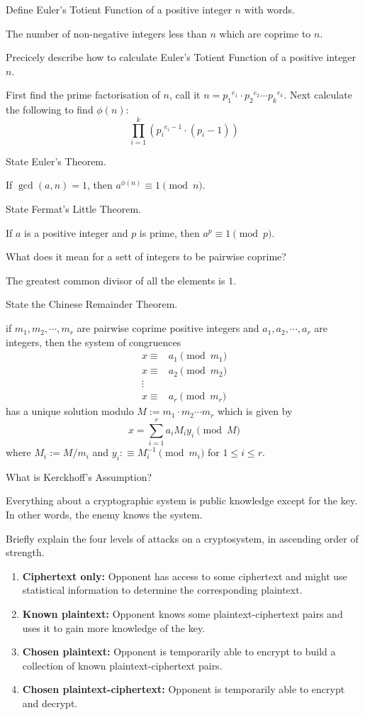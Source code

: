 \documentclass{article}
\newcounter{qcounter}
\newcommand{\showqcounter}{\theqcounter}
\newcommand{\question}{\vspace{5mm}\addtocounter{qcounter}{1}\vspace{5mm}{\bf Q\showqcounter: }}
\newcommand{\answer}{\vspace{5mm}{\bf A\showqcounter: }}
\begin{document}
\question Define Euler's Totient Function of a positive integer $n$ with words.

\answer The number of non-negative integers less than $n$ which are coprime to $n$.


\question Precicely describe how to calculate Euler's Totient Function of a positive integer $n$.

\answer First find the prime factorisation of $n$, call it 
$n = {p_1}^{e_1} \cdot {p_2}^{e_2} \cdots {p_k}^{e_k}$. Next calculate the following to find $\phi(n)$:
$$
    \prod_{i = 1}^k \left( {p_i}^{e_i - 1} \cdot (p_i - 1) \right)
$$

\question State Euler's Theorem.

\answer If $\gcd(a, n) = 1$, then $a^{\phi(n)} \equiv 1 \pmod n$.


\question State Fermat's Little Theorem.

\answer If $a$ is a positive integer and $p$ is prime, then $a^p \equiv 1 \pmod{p}$.


\question What does it mean for a sett of integers to be pairwise coprime?

\answer The greatest common divisor of all the elements is $1$.


\question State the Chinese Remainder Theorem.

\answer if $m_1, m_2, \cdots, m_r$ are pairwise coprime positive integers and $a_1, a_2, \cdots, a_r$ are integers, 
then the system of congruences 
\begin{align*}
x \equiv& a_1 \pmod{m_1} \\
x \equiv& a_2 \pmod{m_2} \\
  \vdots&\\
x \equiv& a_r \pmod{m_r}
\end{align*}
has a unique solution modulo $M := m_1 \cdot m_2 \cdots m_r$ which is given by
$$
    x = \sum_{i=1}^r a_i M_i y_i \pmod{M}
$$
where $M_i := M / m_i$ and $y_i :\equiv M_i^{-1} \pmod{m_i}$ for $1 \leq i \leq r$. 


\question What is Kerckhoff's Assumption?

\answer Everything about a cryptographic system is public knowledge except for the key. In other words, the enemy knows the system.


\question Briefly explain the four levels of attacks on a cryptosystem, in ascending order of strength.

\answer \begin{enumerate}
  \item {\bf Ciphertext only:} Opponent has access to some ciphertext and might use statistical information to determine the corresponding plaintext.
  \item {\bf Known plaintext:} Opponent knows some plaintext-ciphertext pairs and uses it to gain more knowledge of the key.
  \item {\bf Chosen plaintext:} Opponent is temporarily able to encrypt to build a collection of known plaintext-ciphertext pairs. 
  \item {\bf Chosen plaintext-ciphertext:} Opponent is temporarily able to encrypt and decrypt.
\end{enumerate}
\end{document}
